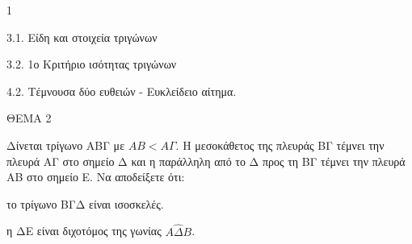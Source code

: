 \begin{ylh}{1}
    \item 3.1. Είδη και στοιχεία τριγώνων
    \item 3.2. 1ο Κριτήριο ισότητας τριγώνων
    \item 4.2. Τέμνουσα δύο ευθειών - Ευκλείδειο αίτημα.
\end{ylh}

ΘΕΜΑ 2

Δίνεται τρίγωνο ΑΒΓ με $ΑΒ < Α\Gamma$. Η μεσοκάθετος της πλευράς ΒΓ τέμνει την πλευρά ΑΓ στο σημείο Δ και η παράλληλη από το Δ προς τη ΒΓ τέμνει την πλευρά ΑΒ στο σημείο Ε. Να αποδείξετε ότι:

\begin{alist}
\item το τρίγωνο ΒΓΔ είναι ισοσκελές. 

\item η ΔΕ είναι διχοτόμος της γωνίας $Α\widehat{\Delta}Β$. 


\begin{center}
\end{center}
\end{alist}

